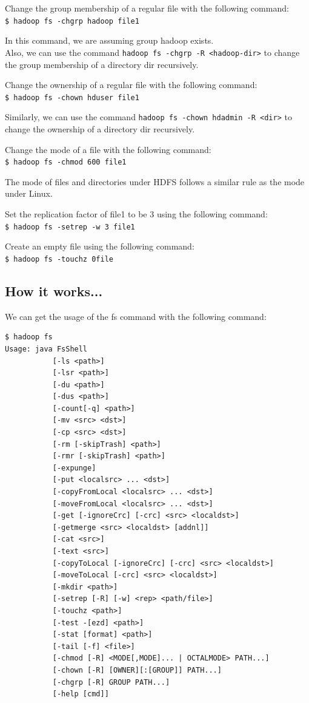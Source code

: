 Change the group membership of a regular file with the following command: \\
\verb|$ hadoop fs -chgrp hadoop file1|

In this command, we are assuming group hadoop exists. \\
Also, we can use the command \verb|hadoop fs -chgrp -R <hadoop-dir>| to change the group membership of a directory dir recursively.

Change the ownership of a regular file with the following command: \\
\verb|$ hadoop fs -chown hduser file1|

Similarly, we can use the command \verb|hadoop fs -chown hdadmin -R <dir>| to change the ownership of a directory dir recursively.

Change the mode of a file with the following command: \\
\verb|$ hadoop fs -chmod 600 file1|

The mode of files and directories under HDFS follows a similar rule as the mode under Linux.

Set the replication factor of file1 to be 3 using the following command:\\
\verb|$ hadoop fs -setrep -w 3 file1|

Create an empty file using the following command: \\
\verb|$ hadoop fs -touchz 0file|
\subsection*{How it works...}
We can get the usage of the fs command with the following command:
\lstset{style=bashstyle}
\begin{lstlisting}
$ hadoop fs
Usage: java FsShell
           [-ls <path>]
           [-lsr <path>]
           [-du <path>]
           [-dus <path>]
           [-count[-q] <path>]
           [-mv <src> <dst>]
           [-cp <src> <dst>]
           [-rm [-skipTrash] <path>]
           [-rmr [-skipTrash] <path>]
           [-expunge]
           [-put <localsrc> ... <dst>]
           [-copyFromLocal <localsrc> ... <dst>]
           [-moveFromLocal <localsrc> ... <dst>]
           [-get [-ignoreCrc] [-crc] <src> <localdst>]
           [-getmerge <src> <localdst> [addnl]]
           [-cat <src>]
           [-text <src>]
           [-copyToLocal [-ignoreCrc] [-crc] <src> <localdst>]
           [-moveToLocal [-crc] <src> <localdst>]
           [-mkdir <path>]
           [-setrep [-R] [-w] <rep> <path/file>]
           [-touchz <path>]
           [-test -[ezd] <path>]
           [-stat [format] <path>]
           [-tail [-f] <file>]
           [-chmod [-R] <MODE[,MODE]... | OCTALMODE> PATH...]
           [-chown [-R] [OWNER][:[GROUP]] PATH...]
           [-chgrp [-R] GROUP PATH...]
           [-help [cmd]]
\end{lstlisting}

